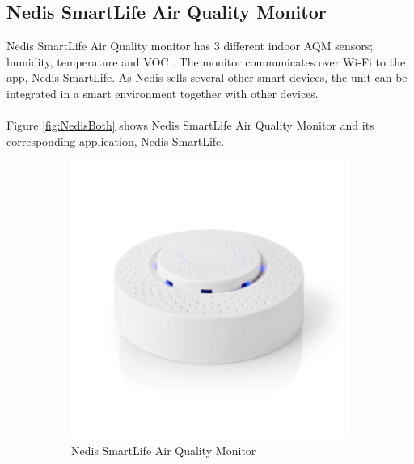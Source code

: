 \subsection{Nedis SmartLife Air Quality Monitor}
Nedis SmartLife Air Quality monitor has 3 different indoor AQM sensors; humidity, temperature and VOC \cite{NedisDevice}. The monitor communicates over Wi-Fi to the app, Nedis SmartLife. As Nedis sells several other smart devices, the unit can be integrated in a smart environment together with other devices. 
\\\\
Figure \ref{fig:NedisBoth} shows Nedis SmartLife Air Quality Monitor and its corresponding application, Nedis SmartLife. 
\begin{figure} [H]
    \centering
    \begin{subfigure}{0.35\textwidth}
         \centering
         \includegraphics[width=1.2\textwidth]{figures/NedisDevice.jpg}
         \caption{Nedis SmartLife Air Quality Monitor \cite{Nedis}}
         \label{fig:NedisApp}
     \end{subfigure}
     \hspace{2cm}
      \begin{subfigure}{0.35\textwidth}
         \centering

\end{subfigure}
\end{figure}
